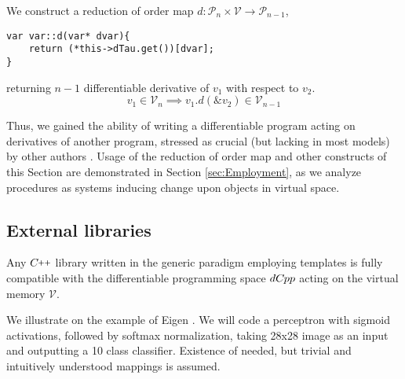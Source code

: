 \documentclass{article}
\newcommand{\VV}{\mathcal{V}}
\newcommand{\CC}{C\nolinebreak\hspace{-.05em}\raisebox{.4ex}{\tiny\bf +}\nolinebreak\hspace{-.10em}\raisebox{.4ex}{\tiny\bf +}}
\def\CC{{C\nolinebreak[4]\hspace{-.05em}\raisebox{.4ex}{\tiny\bf ++}}}
\newcommand{\dP}{\mathcal{P}}
\newcommand{\dCpp}{dC\nolinebreak\hspace{-.05em}\raisebox{.4ex}{\tiny\bf +}\nolinebreak\hspace{-.10em}\raisebox{.4ex}{\tiny\bf p}}
\def\dCpp{{dC\nolinebreak[4]\hspace{-.05em}pp}}
\begin{document}
We construct a reduction of order map $d:\dP_n\times\VV\to\dP_{n-1}$, 

\begin{lstlisting}
var var::d(var* dvar){
    return (*this->dTau.get())[dvar];
}
\end{lstlisting}
returning $n-1$ differentiable derivative of $v_1$ with respect to $v_2$.
\begin{equation}
v_1\in\VV_n\implies v_1.d(\&v_2)\in\VV_{n-1}
\end{equation}

 Thus, we gained the ability of writing a differentiable program acting on derivatives of another program, stressed as crucial (but lacking in most models) by other authors \cite{AD1}. Usage of the reduction of order map and other constructs of
 this Section are demonstrated in Section \ref{sec:Employment}, as we analyze procedures as systems inducing change upon objects in virtual space. 

\subsection{External libraries}

Any $\CC$ library written in the generic paradigm employing templates is fully compatible with the differentiable programming space $\dCpp$ acting on the virtual memory $\VV$. 

We illustrate on the example of Eigen \cite{Eigen}. We will code a perceptron with sigmoid activations, followed by softmax normalization, taking 28x28 image as an input and outputting a 10 class classifier. Existence of needed, but trivial and intuitively understood mappings is assumed. 
\end{document}
